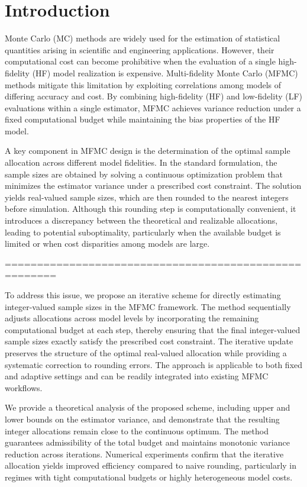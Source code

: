 \section{Introduction}\label{sec:Intro}

Monte Carlo (MC) methods are widely used for the estimation of statistical quantities arising in scientific and engineering applications. However, their computational cost can become prohibitive when the evaluation of a single high-fidelity (HF) model realization is expensive. Multi-fidelity Monte Carlo (MFMC) methods mitigate this limitation by exploiting correlations among models of differing accuracy and cost. By combining high-fidelity (HF) and low-fidelity (LF) evaluations within a single estimator, MFMC achieves variance reduction under a fixed computational budget while maintaining the bias properties of the HF model.



A key component in MFMC design is the determination of the optimal sample allocation across different model fidelities. In the standard formulation, the sample sizes are obtained by solving a continuous optimization problem that minimizes the estimator variance under a prescribed cost constraint. The solution yields real-valued sample sizes, which are then rounded to the nearest integers before simulation. Although this rounding step is computationally convenient, it introduces a discrepancy between the theoretical and realizable allocations, leading to potential suboptimality, particularly when the available budget is limited or when cost disparities among models are large.

======================================================

To address this issue, we propose an iterative scheme for directly estimating integer-valued sample sizes in the MFMC framework. The method sequentially adjusts allocations across model levels by incorporating the remaining computational budget at each step, thereby ensuring that the final integer-valued sample sizes exactly satisfy the prescribed cost constraint. The iterative update preserves the structure of the optimal real-valued allocation while providing a systematic correction to rounding errors. The approach is applicable to both fixed and adaptive settings and can be readily integrated into existing MFMC workflows.

We provide a theoretical analysis of the proposed scheme, including upper and lower bounds on the estimator variance, and demonstrate that the resulting integer allocations remain close to the continuous optimum. The method guarantees admissibility of the total budget and maintains monotonic variance reduction across iterations. Numerical experiments confirm that the iterative allocation yields improved efficiency compared to naive rounding, particularly in regimes with tight computational budgets or highly heterogeneous model costs.

